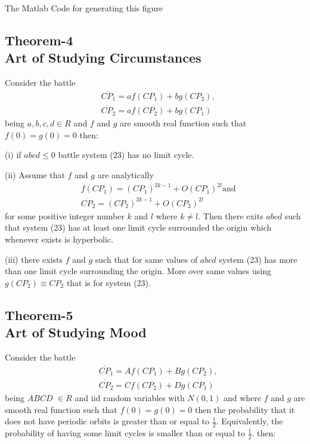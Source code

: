 \documentclass[]{article}
\begin{document}
The Matlab Code for generating this figure 
\newpage

 
\tiny

\normalsize
\newpage
\subsection{Theorem-4\\Art of Studying Circumstances }
Consider the battle
\begin{equation}
\begin{split}
    &\Dot{CP_1}=af(CP_1)+bg(CP_2),\\&\Dot{CP_2}=af(CP_2)+bg(CP_1) 
\end{split}
\end{equation}
being $a,b,c,d \in {R}$ and $f$ and $g$ are smooth real function such that $f(0)=g(0)=0$
then:

(i) if $abcd \leq 0$ battle system (23) has no limit cycle.

(ii) Assume that $f$ and $g$ are analytically
\begin{equation}
\begin{split}
  &f(CP_1)=(CP_1)^{{2k}-1}+O(CP_1)^{2l} \text{and} \\&  \Dot{CP_2}=(CP_2)^{{2k}-1}+O(CP_2)^{2l}  
\end{split}
\end{equation}
for some positive integer number $k$ and $l$ where $k \neq l$. Then there exits $abcd$ such that system (23) has at least one limit cycle surrounded the origin which whenever exists is hyperbolic.

(iii) there exists $f$ and $g$ such that for same values of $abcd$ system (23) has more than one limit cycle surrounding the origin. More over same values using $g(CP_2)\equiv CP_2$ that is for system (23).
\newpage
\subsection{Theorem-5\\Art of Studying Mood}
Consider the battle
\begin{equation}
\begin{split}
  &\Dot{CP_1}=Af(CP_1)+Bg(CP_2),\\&\Dot{CP_2}=Cf(CP_2)+Dg(CP_1)  
\end{split}
\end{equation}
being $ABCD$ $\in {R}$ and iid random variables with $N(0,1)$  and where $f$ and $g$ are smooth real function such that $f(0)=g(0)=0$ then the probability that it does not have periodic orbits is greater than or equal to $\frac{1}{2}$. 
Equivalently, the probability of having some limit cycles is smaller than or equal to $\frac{1}{2}$.
then:
\end{document}
